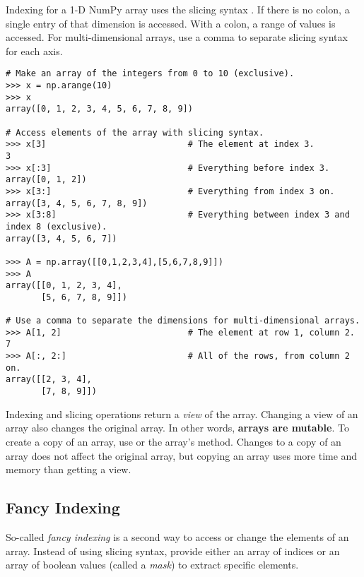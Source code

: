 Indexing for a 1-D NumPy array uses the slicing syntax .
If there is no colon, a single entry of that dimension is accessed.
With a colon, a range of values is accessed.
For multi-dimensional arrays, use a comma to separate slicing syntax for each axis.

\begin{lstlisting}
# Make an array of the integers from 0 to 10 (exclusive).
>>> x = np.arange(10)
>>> x
array([0, 1, 2, 3, 4, 5, 6, 7, 8, 9])

# Access elements of the array with slicing syntax.
>>> x[3]                            # The element at index 3.
3
>>> x[:3]                           # Everything before index 3.
array([0, 1, 2])
>>> x[3:]                           # Everything from index 3 on.
array([3, 4, 5, 6, 7, 8, 9])
>>> x[3:8]                          # Everything between index 3 and index 8 (exclusive).
array([3, 4, 5, 6, 7])

>>> A = np.array([[0,1,2,3,4],[5,6,7,8,9]])
>>> A
array([[0, 1, 2, 3, 4],
       [5, 6, 7, 8, 9]])

# Use a comma to separate the dimensions for multi-dimensional arrays.
>>> A[1, 2]                         # The element at row 1, column 2.
7
>>> A[:, 2:]                        # All of the rows, from column 2 on.
array([[2, 3, 4],
       [7, 8, 9]])
\end{lstlisting}


\begin{info} %
Indexing and slicing operations return a \emph{view} of the array.
Changing a view of an array also changes the original array.
In other words, \textbf{arrays are mutable}.
To create a copy of an array, use  or the array's  method.
Changes to a copy of an array does not affect the original array, but copying an array uses more time and memory than getting a view.
\end{info}

\subsection*{Fancy Indexing} %

So-called \emph{fancy indexing} is a second way to access or change the elements of an array.
Instead of using slicing syntax, provide either an array of indices or an array of boolean values (called a \emph{mask}) to extract specific elements.

